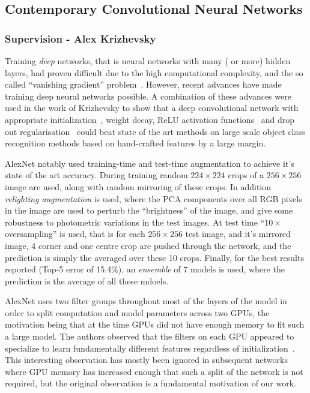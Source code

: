 \documentclass[thesis]{subfiles}
\begin{document}
\subsection{Contemporary Convolutional Neural Networks}
\subsubsection{Supervision - Alex Krizhevsky \etal}
Training \emph{deep} networks, that is neural networks with many ( or more) hidden layers, had proven difficult due to the high computational complexity, and the so called ``vanishing gradient'' problem~\cite{bengio:ieeenn94}. However, recent advances have made training deep neural networks possible. A combination of these advances were used in the work of Krizhevsky \etal\cite{Krizhevsky2012imanet} to show that a deep convolutional network with appropriate initialization~\cite{Sutskever2013momentum}, weight decay, ReLU activation functions~\cite{conf/icml/NairH10} and drop out regularisation~\cite{1207.0580v1} could beat state of the art methods on large scale object class recognition methods based on hand-crafted features by a large margin. 

AlexNet notably used training-time and test-time augmentation to achieve it's state of the art accuracy. During training random $224 \times 224$ crops of a $256 \times 256$ image are used, along with random mirroring of these crops. In addition \emph{relighting augmentation} is used, where the PCA components over all RGB pixels in the image are used to perturb the ``brightness'' of the image, and give some robustness to photometric variations in the test images. At test time ``$10\times$ oversampling'' is used, that is for each $256\times 256$ test image, and it's mirrored image, 4 corner and one centre crop are pushed through the network, and the prediction is simply the averaged over these 10 crops. Finally, for the best results reported (Top-5 error of 15.4\%), an \emph{ensemble} of 7 models is used, where the prediction is the average of all these mdoels. 

AlexNet uses two filter groups throughout most of the layers of the model in order to split computation and model parameters across two GPUs, the motivation being that at the time GPUs did not have enough memory to fit such a large model. The authors observed that the filters on each GPU appeared to specialize to learn fundamentally different features regardless of initialization~\cite{Krizhevsky2012imanet}. This interesting observation has mostly been ignored in subsequent networks where GPU memory has increased enough that such a split of the network is not required, but the original observation is a fundamental motivation of our work.
\end{document}
